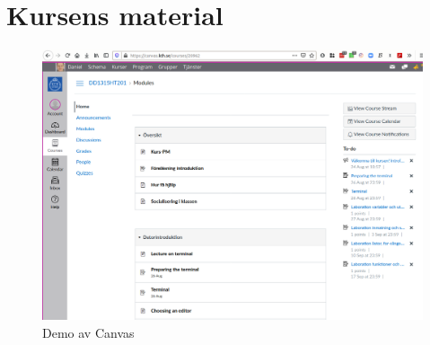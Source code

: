 \section{Kursens material}

\begin{frame}
  \begin{figure}
    \includegraphics[height=0.8\textheight]{canvas.png}
    \caption{Demo av Canvas}
  \end{figure}
\end{frame}

